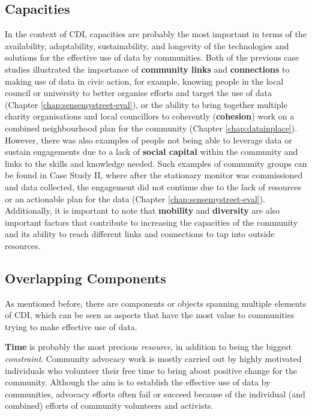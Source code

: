 \subsection{Capacities}
In the context of CDI, capacities are probably the most important in terms of the availability, adaptability, sustainability, and longevity of the technologies and solutions for the effective use of data by communities. Both of the previous case studies illustrated the importance of \textbf{community links} and \textbf{connections} to making use of data in civic action, for example, knowing people in the local council or university to better organise efforts and target the use of data (Chapter \ref{chap:sensemystreet-eval}), or the ability to bring together multiple charity organisations and local councillors to coherently (\textbf{cohesion}) work on a combined neighbourhood plan for the community (Chapter \ref{chap:datainplace}). However, there was also examples of people not being able to leverage data or sustain engagements due to a lack of \textbf{social capital} within the community and links to the skills and knowledge needed. Such examples of community groups can be found in Case Study II, where after the stationary monitor was commissioned and data collected, the engagement did not continue due to the lack of resources or an actionable plan for the data (Chapter \ref{chap:sensemystreet-eval}). Additionally, it is important to note that \textbf{mobility} and \textbf{diversity} are also important factors that contribute to increasing the capacities of the community and its ability to reach different links and connections to tap into outside resources.

\subsection{Overlapping Components}
As mentioned before, there are components or objects spanning multiple elements of CDI, which can be seen as aspects that have the most value to communities trying to make effective use of data.
\newline

\textbf{Time} is probably the most precious \textit{resource}, in addition to being the biggest \textit{constraint}. Community advocacy work is mostly carried out by highly motivated individuals who volunteer their free time to bring about positive change for the community. Although the aim is to establish the effective use of data by communities, advocacy efforts often fail or succeed because of the individual (and combined) efforts of community volunteers and activists.
\newline

